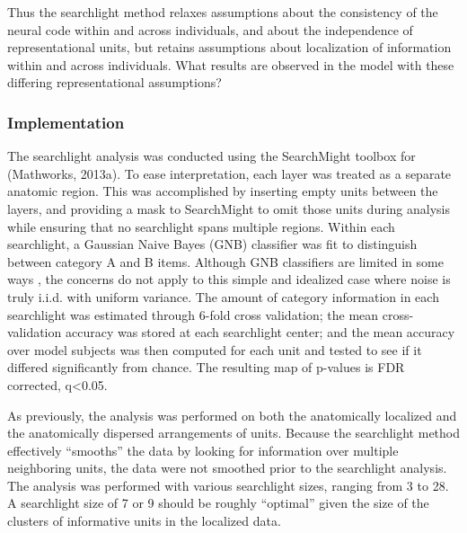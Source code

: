 Thus the searchlight method relaxes assumptions about the consistency of the neural code within and across individuals, and about the independence of representational units, but retains assumptions about localization of information within and across individuals. What results are observed in the model with these differing representational assumptions?

\subsubsection{Implementation}
The searchlight analysis was conducted using the SearchMight toolbox \cite{pereira_information_2011} for \matlab (Mathworks, 2013a). To ease interpretation, each layer was treated as a separate anatomic region. This was accomplished by inserting empty units between the layers, and providing a mask to SearchMight to omit those units during analysis while ensuring that no searchlight spans multiple regions. Within each searchlight, a Gaussian Naive Bayes (GNB) classifier was fit to distinguish between category A and B items. Although GNB classifiers are limited in some ways \cite{pereira_information_2011}, the concerns do not apply to this simple and idealized case where noise is truly i.i.d. with uniform variance. The amount of category information in each searchlight was estimated through 6-fold cross validation; the mean cross-validation accuracy was stored at each searchlight center; and the mean accuracy over model subjects was then computed for each unit and tested to see if it differed significantly from chance. The resulting map of p-values is FDR corrected, q<0.05.

As previously, the analysis was performed on both the anatomically localized and the anatomically dispersed arrangements of units. Because the searchlight method effectively ``smooths'' the data by looking for information over multiple neighboring units, the data were not smoothed prior to the searchlight analysis. The analysis was performed with various searchlight sizes, ranging from 3 to 28. A searchlight size of 7 or 9 should be roughly ``optimal'' given the size of the clusters of informative units in the localized data.

